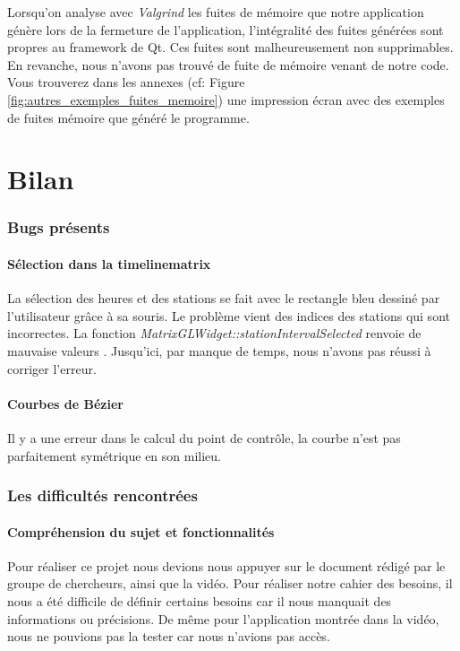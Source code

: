 \documentclass[12pt]{article}
\begin{document}
		Lorsqu'on analyse avec \textit{Valgrind} les fuites de mémoire que notre application
		génère lors de la fermeture de l'application, l’intégralité des fuites
		générées sont propres au framework de Qt. Ces fuites sont malheureusement non
		supprimables.\\
		En revanche, nous n'avons pas trouvé de fuite de mémoire venant de notre code.\\
		
		Vous trouverez dans les annexes (cf: Figure \ref{fig:autres_exemples_fuites_memoire}) une
		impression écran avec des exemples de fuites mémoire que généré le programme.
	
\newpage
\part{Bilan}
	\section{Bugs présents}		
		\subsection{Sélection dans la timelinematrix}
		La sélection des heures et des stations se fait avec le rectangle bleu dessiné par
		l'utilisateur grâce à sa souris. Le problème vient des indices des stations qui
		sont incorrectes.
		La fonction \textit{MatrixGLWidget::stationIntervalSelected} renvoie de mauvaise valeurs
		. Jusqu'ici, par manque de temps, nous n'avons pas réussi à corriger l'erreur.
		
		\subsection{Courbes de Bézier}
		Il y a une erreur dans le calcul du point de contrôle, la courbe n'est pas parfaitement
		symétrique en son milieu.
		
	\newpage
	\section{Les difficultés rencontrées}
		\subsection{Compréhension du sujet et fonctionnalités}
		Pour réaliser ce projet nous devions nous appuyer sur le document rédigé par le groupe de
	chercheurs, ainsi que la vidéo. Pour réaliser notre cahier des besoins, il nous a été
	difficile de définir certains besoins car il nous manquait des informations ou précisions.
	De même pour l’application montrée dans la vidéo, nous ne pouvions pas la tester car nous
	n'avions pas accès.\\
\end{document}
